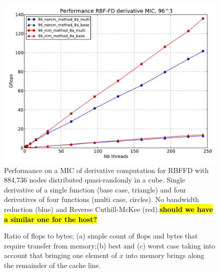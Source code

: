 \documentclass[10pt,conference,compsocconf]{IEEEtran}
\newcommand{\todo}[1]{{\color{red}\textbf{\hl{#1}}\xspace}}
\begin{document}
\begin{figure}
  \centering
  \includegraphics[width=.45\textwidth]{figures/plot_for_natasha_ncar_end_of_year.pdf}

  \caption{Performance on a MIC of derivative computation for RBFFD
    with 884,736 nodes distributed quasi-randomly in a cube. Single
    derivative of a single function (base case, triangle) and four
    derivatives of four functions (multi case, circles). No bandwidth
    reduction (blue) and Reverse Cuthill-McKee (red).\todo{should we have a similar one for the host?}}
\end{figure}

\begin{figure}
\centering
{} %
\caption{Ratio of flops to bytes; (a) simple count of flops and bytes that require transfer from memory;(b) best and (c) worst
case taking into account that bringing one element of $x$ into memory brings along the remainder of the cache line.}
\label{fig:ratio_bytes_flops}
\end{figure}
\end{document}
